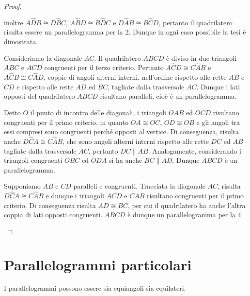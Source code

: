 \begin{proof}
\begin{enumerate*}
inoltre \(A\widehat{D}B\cong D\widehat{B}C\), \(A\widehat{B}D\cong 
B\widehat{D}C\) e \(D\widehat{A}B\cong B\widehat{C}D\), pertanto il 
quadrilatero risulta essere un parallelogramma per la 2. Dunque in 
ogni caso possibile la tesi è dimostrata.
\item Consideriamo la diagonale \(AC\). Il quadrilatero \(ABCD\) è diviso 
in due triangoli \(ABC\) e \(ACD\) congruenti per il terzo criterio. 
Pertanto \(A\widehat{C}D\cong C\widehat{A}B\) e \(A\widehat{C}B\cong 
C\widehat{A}D\), coppie di angoli alterni interni, nell'ordine 
rispetto alle rette \(AB\) e \(CD\) e rispetto alle rette \(AD\) ed \(BC\), 
tagliate dalla trasversale \(AC\). Dunque i lati opposti del 
quadrilatero \(ABCD\) risultano paralleli, cioè è un parallelogramma.
\item Detto \(O\) il punto di incontro delle diagonali, i triangoli 
\(OAB\) ed \(OCD\) risultano congruenti per il primo criterio, in quanto 
\(OA\cong OC\), \(OD\cong OB\) e gli angoli tra essi compresi sono 
congruenti perché opposti al vertice. Di conseguenza, risulta anche 
\(D\widehat{C}A\cong C\widehat{A}B\), che sono angoli alterni interni 
rispetto alle rette \(DC\) ed \(AB\) tagliate dalla trasversale \(AC\), 
pertanto \(DC\parallel AB\). Analogamente, considerando i triangoli 
congruenti \(OBC\) ed \(ODA\) si ha anche \(BC\parallel AD\). Dunque \(ABCD\) 
è un parallelogramma.
\item Supponiamo \(AB\) e \(CD\) paralleli e congruenti. Tracciata la 
diagonale \(AC\), risulta \(D\widehat{C}A\cong C\widehat{A}B\) e dunque i 
triangoli \(ACD\) e \(CAB\) risultano congruenti per il primo criterio. 
Di conseguenza risulta \(AD\cong BC\), per cui il quadrilatero ha anche 
l'altra coppia di lati opposti congruenti. \(ABCD\) è dunque un 
parallelogramma per la 4.
\end{enumerate*}
\end{proof}

\section{Parallelogrammi 
particolari}\label{sect:parallelogrammi_particolari}

I parallelogrammi possono essere sia equiangoli sia equilateri.

